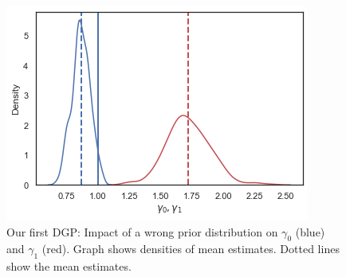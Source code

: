 \begin{figure}[H]
  \centering
    \includegraphics[width=\linewidth]{graphics/dgp_1_wrong_prior}
    \caption{Our first DGP: Impact of a wrong prior distribution on $\gamma_0$ (blue) and $\gamma_1$ (red). Graph shows densities of mean estimates. Dotted lines show the mean estimates.}
  \label{fig:wrong_prior_dgp1}
\end{figure}

